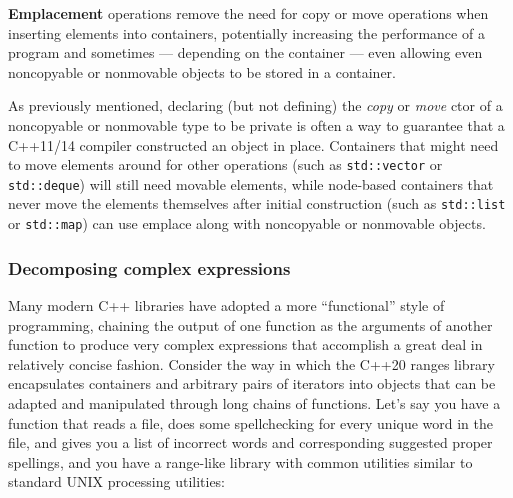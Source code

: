 \noindent \textbf{Emplacement} operations remove the need for copy or move
operations when inserting elements into containers, potentially
increasing the performance of a program and sometimes --- depending on the
container --- even allowing even noncopyable or nonmovable objects to be stored
in a container.

As previously mentioned,
declaring (but not defining) the \emph{copy} or \emph{move} ctor of a
noncopyable or nonmovable type to be private is often a way to guarantee that
a C++11/14 compiler constructed an object in place.
Containers that might need to move elements around for other operations
(such as \texttt{std::vector} or \texttt{std::deque}) will still need
movable elements, while node-based containers that never move the
elements themselves after initial construction (such as
\texttt{std::list} or \texttt{std::map}) can use emplace along with
noncopyable or nonmovable objects.

\subsubsection[Decomposing complex expressions]{Decomposing complex expressions}\label{decomposing-complex-expressions}

Many modern C++ libraries have adopted a more ``functional'' style of
programming, chaining the output of one function as the arguments of
another function to produce very complex expressions that accomplish a
great deal in relatively concise fashion. Consider the way in which the
C++20 ranges library encapsulates containers and arbitrary pairs of
iterators into objects that can be adapted and manipulated through long
chains of functions. Let's say you have a function that reads a file,
does some spellchecking for every unique word in the file, and gives you a
list of incorrect words and corresponding suggested proper spellings,
and you have a range-like library with common utilities similar to
standard UNIX processing utilities:

